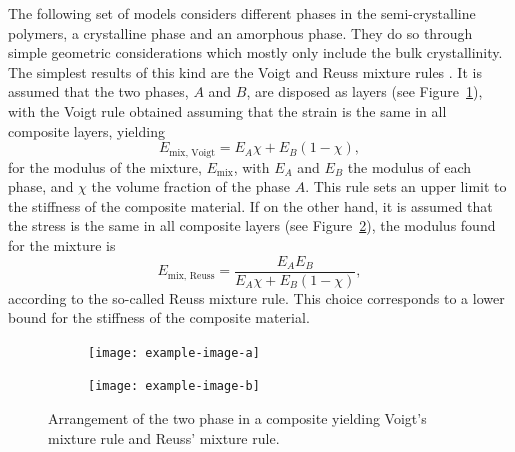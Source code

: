 The following set of models considers different phases in the semi-crystalline polymers, a crystalline phase and an amorphous phase.
They do so through simple geometric considerations which mostly only include the bulk crystallinity.
The simplest results of this kind are the Voigt and Reuss mixture rules \citep{wardIntroductionMechanicalProperties2004}.
It is assumed that the two phases, $A$ and $B$, are disposed as layers (see Figure~\ref{subfig:voigt_mixture_rule}), with the Voigt rule obtained assuming that the strain is the same in all composite layers, yielding
\begin{equation}
	\label{eq:voigt_mixture_rule}
	E_\text{mix, Voigt} = E_A \chi + E_B (1 - \chi),
\end{equation}
for the modulus of the mixture, $E_\text{mix}$, with $E_A$ and $E_B$ the modulus of each phase, and $\chi$ the volume fraction of the phase $A$.
This rule sets an upper limit to the stiffness of the composite material.
If on the other hand, it is assumed that the stress is the same in all composite layers (see Figure~\ref{subfig:reuss_mixture_rule}), the modulus found for the mixture is
\begin{equation}
	E_\text{mix, Reuss} = \frac{E_A E_B}{E_A \chi + E_B (1-\chi)},
\end{equation}
according to the so-called Reuss mixture rule.
This choice corresponds to a lower bound for the stiffness of the composite material.
\begin{figure}
\centering
\begin{subfigure}[b]{0.45\textwidth}
            \centering
            \texttt{[image: example-image-a]}
            \caption{}
            \label{subfig:voigt_mixture_rule}
    \end{subfigure} \hfill
    \begin{subfigure}[b]{0.45\textwidth}
            \centering
            \texttt{[image: example-image-b]}
            \caption{}
            \label{subfig:reuss_mixture_rule}
    \end{subfigure}
  \caption{Arrangement of the two phase in a composite yielding  Voigt's mixture rule and  Reuss' mixture rule.}
\label{fig:mixture_rules}
\end{figure}

